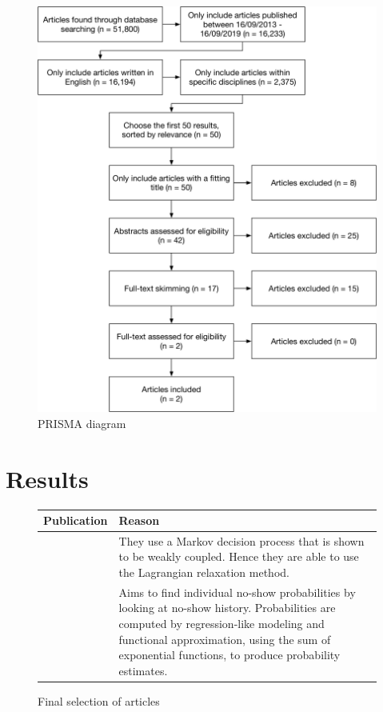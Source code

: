 \documentclass[a4paper,12pt]{article}
\begin{document}
\begin{figure}[H]
    \begin{center}
    \includegraphics[scale=0.5]{PRISMA.pdf}
    \end{center}
    \caption{PRISMA diagram}
    \label{prisma}
\end{figure}

\section{Results}

\begin{figure}[H]
    \begin{table}[H]
    \begin{tabularx}{\textwidth}{@{} c Y @{}}
    \toprule
    Publication & Reason \\ \midrule
    \cite{BD29}        &    They use a Markov decision process that is shown to be weakly coupled. Hence they are able to use the Lagrangian relaxation method. \\
    \cite{BD25}        &    Aims to find individual no-show probabilities by looking at no-show history. Probabilities are computed by regression-like modeling and functional approximation, using the sum of exponential functions, to produce probability estimates. \\
    \bottomrule
    \end{tabularx}
    \end{table}
    \caption{Final selection of articles}
    \label{good}
\end{figure}
\end{document}
